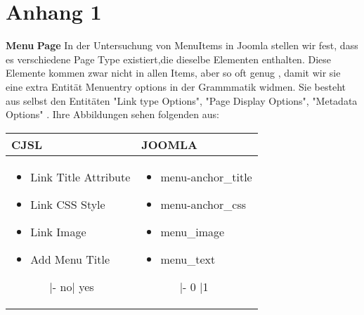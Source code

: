 \chapter{Anhang 1}
\textbf{Menu} \linebreak
\textbf{Page} \linebreak
In der Untersuchung von MenuItems in Joomla stellen wir fest, dass es verschiedene Page Type existiert,die dieselbe   Elementen enthalten. Diese Elemente kommen zwar nicht in allen Items, aber so oft genug , damit wir sie eine extra Entität  Menuentry options in der Grammmatik widmen. Sie besteht aus selbst den Entitäten "Link type Options", "Page Display Options", "Metadata Options"  . Ihre Abbildungen sehen folgenden aus:
\linebreak
\linebreak
\begin{minipage}{0.5\textwidth}
\begin{tabular}{|p{}|p{} |}
\hline
\textbf{CJSL} 
&  
\textbf{JOOMLA} \\ \hline
\begin{itemize}
\item Link Title Attribute
\item Link CSS Style
\item Link Image
\item Add Menu Title
	\begin{enumerate}
	\item[|-]no| yes
	\end{enumerate}
\end{itemize}
&
\begin{itemize}
\item menu-anchor\_title
\item menu-anchor\_css
\item menu\_image
\item menu\_text
	\begin{enumerate}
		\item[|-] 0 |1
	\end{enumerate}
\end{itemize} \\ \hline
\end{tabular}
\end{minipage}

